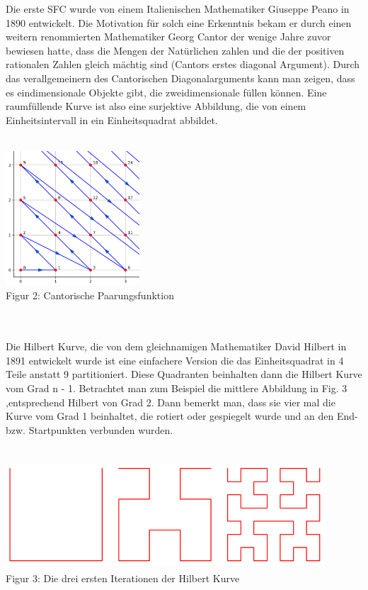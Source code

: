 \documentclass[course=erap]{aspdoc}
\begin{document}
Die erste SFC wurde von einem Italienischen Mathematiker Giuseppe Peano in 1890 entwickelt. 
\newpage
Die Motivation für solch eine Erkenntnis bekam er durch einen weitern  renommierten Mathematiker Georg Cantor der wenige Jahre zuvor bewiesen hatte, dass die Mengen der Natürlichen zahlen und die der positiven rationalen Zahlen gleich mächtig sind (Cantors erstes diagonal Argument). 
Durch das verallgemeinern des Cantorischen Diagonalarguments kann man zeigen, dass es eindimensionale Objekte gibt, die zweidimensionale füllen können. Eine raumfüllende Kurve ist also eine surjektive Abbildung, die von einem Einheitsintervall in ein Einheitsquadrat abbildet.
\\
\\
\begin{center}
	\includegraphics[width=5cm, height=5cm]{Cantor}\\	%
	\tiny Figur 2: Cantorische Paarungsfunktion
\end{center}
\	\\
\\
Die Hilbert Kurve, die von dem gleichnamigen Mathematiker David Hilbert in 1891 entwickelt wurde ist eine einfachere Version die das Einheitsquadrat in 4 Teile anstatt 9 partitioniert. Diese Quadranten beinhalten dann die Hilbert Kurve vom Grad n - 1. Betrachtet man zum Beispiel die mittlere Abbildung in Fig. 3 ,entsprechend Hilbert von Grad 2. Dann bemerkt man, dass sie vier mal die Kurve vom Grad 1 beinhaltet, die rotiert oder gespiegelt wurde und an den End- bzw. Startpunkten verbunden wurden.
\\
\\
\begin{center}
	\includegraphics[width=12cm, height=4cm]{Hilbert}\\	%
	\tiny Figur 3: Die drei ersten Iterationen der Hilbert Kurve
\end{center}
\end{document}
